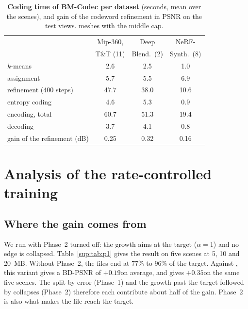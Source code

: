 \begin{table}[!htb]\centering\footnotesize
\caption{\textbf{Coding time of BM-Codec per dataset} (seconds, mean over the scenes), and gain of the codeword refinement in PSNR on the test views. \MSc meshes with the middle cap.}
\label{sup:tab:time}
\setlength{\tabcolsep}{3pt}
\begin{tabular}{@{}lccc@{}}
\toprule
 & Mip-360, & Deep & NeRF- \\
 & T\&T (11) & Blend.\ (2) & Synth.\ (8) \\
\midrule
$k$-means & 2.6 & 2.5 & 1.0 \\
assignment & 5.7 & 5.5 & 6.9 \\
refinement (400 steps) & 47.7 & 38.0 & 10.6 \\
entropy coding & 4.6 & 5.3 & 0.9 \\
\midrule
encoding, total & 60.7 & 51.3 & 19.4 \\
decoding & 3.7 & 4.1 & 0.8 \\
\midrule
gain of the refinement (dB) & 0.25 & 0.32 & 0.16 \\
\bottomrule
\end{tabular}
\end{table}

\section{Analysis of the rate-controlled training}
\label{sup:training}

\subsection{Where the gain comes from}
We run \BM with Phase~2 turned off: the growth aims at the target ($\alpha = 1$) and no edge is collapsed. Table~\ref{sup:tab:p1} gives the result on five scenes at 5, 10 and 20~MB. Without Phase~2, the files end at 77\% to 96\% of the target. Against \MSc, this variant gives a BD-PSNR of $+0.19$\dB on average, and \BM gives $+0.35$\dB on the same five scenes. The split by error (Phase~1) and the growth past the target followed by collapses (Phase~2) therefore each contribute about half of the gain. Phase~2 is also what makes the file reach the target.

